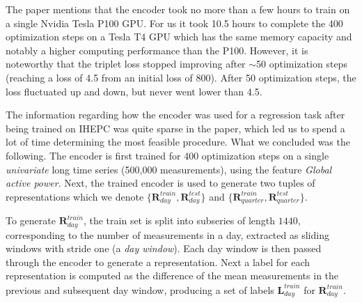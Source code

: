 \documentclass{article}
\begin{document}
The paper mentions that the encoder took no more than a few hours to train on a single Nvidia Tesla P100 GPU. For us it took 10.5 hours to complete the 400 optimization steps on a Tesla T4 GPU which has the same memory capacity and notably a higher computing performance than the P100. However, it is noteworthy that the triplet loss stopped improving after $\sim$50 optimization steps (reaching a loss of 4.5 from an initial loss of 800). After 50 optimization steps, the loss fluctuated up and down, but never went lower than 4.5.

The information regarding how the encoder was used for a regression task after being trained on IHEPC was quite sparse in the paper, which led us to spend a lot of time determining the most feasible procedure. What we concluded was the following. 
The encoder is first trained for 400 optimization steps on a single \textit{univariate} long time series (500,000 measurements), using the feature  \textit{Global active power}. 
Next, the trained encoder is used to generate two tuples of representations which we denote $\{\mathbf{R}_{day}^{train},\mathbf{R}_{day}^{test}\}$ and $\{\mathbf{R}_{quarter}^{train},\mathbf{R}_{quarter}^{test}\}$.

To generate $\mathbf{R}_{day}^{train}$, the train set is split into subseries of length $1440$, corresponding to the number of measurements in a day, extracted as sliding windows with stride one (a \textit{day window}). Each day window is then passed through the encoder to generate a representation. Next a label for each representation is computed as the difference of the mean measurements in the previous and subsequent day window, producing a set of labels $\mathbf{L}_{day}^{train}$ for $\mathbf{R}_{day}^{train}$.
\end{document}
